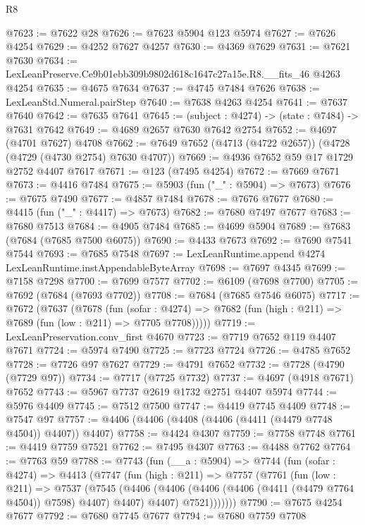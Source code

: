 \begin{lexlean}{R8}
\begin{coremodule}
@7623 := @7622 @28
@7626 := @7623 @5904 @123 @5974
@7627 := @7626 @4254
@7629 := @4252 @7627 @4257
@7630 := @4369 @7629
@7631 := @7621 @7630
@7634 := LexLeanPreserve.Ce9b01ebb309b9802d618c1647c27a15e.R8.__fits_46 @4263 @4254
@7635 := @4675 @7634
@7637 := @4745 @7484 @7626
@7638 := LexLeanStd.Numeral.pairStep
@7640 := @7638 @4263 @4254
@7641 := @7637 @7640
@7642 := @7635 @7641
@7645 := (subject : @4274) -> (state : @7484) -> @7631 @7642
@7649 := @4689 @2657 @7630 @7642 @2754
@7652 := @4697 (@4701 @7627) @4708
@7662 := @7649 @7652 (@4713 (@4722 @2657)) (@4728 (@4729 (@4730 @2754) @7630 @4707))
@7669 := @4936 @7652 @59 @17 @1729 @2752 @4407 @7617
@7671 := @123 (@7495 @4254)
@7672 := @7669 @7671
@7673 := @4416 @7484
@7675 := @5903 (fun ("_" : @5904) => @7673)
@7676 := @7675 @7490
@7677 := @4857 @7484
@7678 := @7676 @7677
@7680 := @4415 (fun ("_" : @4417) => @7673)
@7682 := @7680 @7497 @7677
@7683 := @7680 @7513
@7684 := @4905 @7484
@7685 := @4699 @5904
@7689 := @7683 (@7684 (@7685 @7500 @6075))
@7690 := @4433 @7673
@7692 := @7690 @7541 @7544
@7693 := @7685 @7548
@7697 := LexLeanRuntime.append @4274 LexLeanRuntime.instAppendableByteArray
@7698 := @7697 @4345
@7699 := @7158 @7298
@7700 := @7699 @7577
@7702 := @6109 (@7698 @7700)
@7705 := @7692 (@7684 (@7693 @7702))
@7708 := @7684 (@7685 @7546 @6075)
@7717 := @7672
    (@7637
      (@7678
        (fun (sofar : @4274) =>
        @7682 (fun (high : @211) => @7689 (fun (low : @211) => @7705 @7708)))))
@7719 := LexLeanPreservation.conv_first @4670
@7723 := @7719 @7652 @119 @4407 @7671
@7724 := @5974 @7490
@7725 := @7723 @7724
@7726 := @4785 @7652
@7728 := @7726 @97 @7627
@7729 := @4791 @7652
@7732 := @7728 (@4790 (@7729 @97))
@7734 := @7717 (@7725 @7732)
@7737 := @4697 (@4918 @7671) @7652
@7743 := @5967 @7737 @2619 @1732 @2751 @4407 @5974
@7744 := @5976 @4409
@7745 := @7512 @7500
@7747 := @4419 @7745 @4409
@7748 := @7547 @97
@7757 := @4406 (@4406 (@4408 (@4406 (@4411 (@4479 @7748 @4504)) @4407)) @4407)
@7758 := @4424 @4307
@7759 := @7758 @7748
@7761 := @4419 @7759 @7521
@7762 := @7495 @4307
@7763 := @4488 @7762
@7764 := @7763 @59
@7788 := @7743
    (fun (__a : @5904) =>
    @7744
      (fun (sofar : @4274) =>
      @4413
        (@7747
          (fun (high : @211) =>
          @7757
            (@7761
              (fun (low : @211) =>
              @7537
                (@7545
                  (@4406
                    (@4406 (@4406 (@4406 (@4411 (@4479 @7764 @4504)) @7598) @4407) @4407)
                    @4407)
                  @7521)))))))
@7790 := @7675 @4254 @7677
@7792 := @7680 @7745 @7677
@7794 := @7680 @7759 @7708

\end{coremodule}
\end{lexlean}
